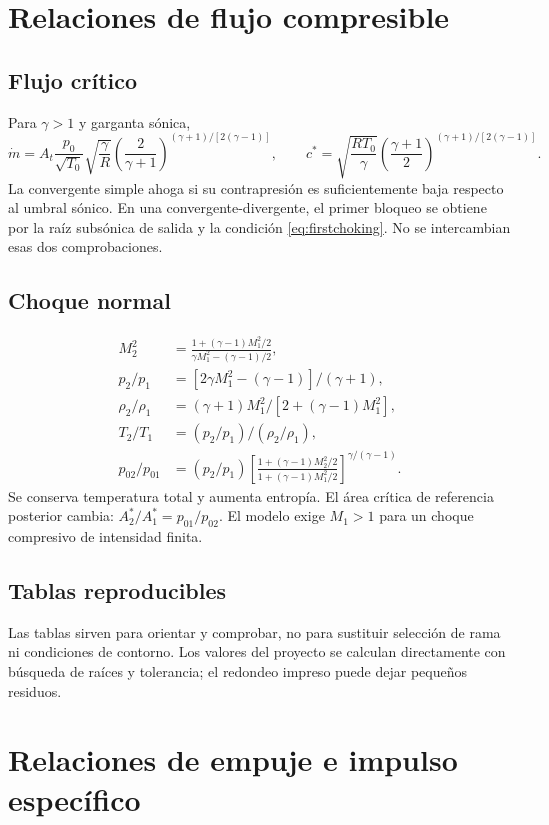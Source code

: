 \chapter{Relaciones de flujo compresible}\label{app:compressible}
\section{Flujo crítico}
Para $\gamma>1$ y garganta sónica,
\[
 \dot m=A_t\frac{p_0}{\sqrt{T_0}}\sqrt{\frac\gamma R}
 \left(\frac2{\gamma+1}\right)^{(\gamma+1)/[2(\gamma-1)]},
\qquad
 c^*=\sqrt{\frac{RT_0}\gamma}
 \left(\frac{\gamma+1}2\right)^{(\gamma+1)/[2(\gamma-1)]}.
\]
La convergente simple ahoga si su contrapresión es suficientemente baja respecto al umbral sónico. En una convergente-divergente, el primer bloqueo se obtiene por la raíz subsónica de salida y la condición \eqref{eq:firstchoking}. No se intercambian esas dos comprobaciones.
\section{Choque normal}
\begin{align*}
 M_2^2&=\frac{1+(\gamma-1)M_1^2/2}{\gamma M_1^2-(\gamma-1)/2},\\
 p_2/p_1&=[2\gamma M_1^2-(\gamma-1)]/(\gamma+1),\\
 \rho_2/\rho_1&=(\gamma+1)M_1^2/[2+(\gamma-1)M_1^2],\\
 T_2/T_1&=(p_2/p_1)/(\rho_2/\rho_1),\\
 p_{02}/p_{01}&=(p_2/p_1)\left[\frac{1+(\gamma-1)M_2^2/2}{1+(\gamma-1)M_1^2/2}\right]^{\gamma/(\gamma-1)}.
\end{align*}
Se conserva temperatura total y aumenta entropía. El área crítica de referencia posterior cambia: $A^*_2/A^*_1=p_{01}/p_{02}$. El modelo exige $M_1>1$ para un choque compresivo de intensidad finita.
\section{Tablas reproducibles}

Las tablas sirven para orientar y comprobar, no para sustituir selección de rama ni condiciones de contorno. Los valores del proyecto se calculan directamente con búsqueda de raíces y tolerancia; el redondeo impreso puede dejar pequeños residuos.
\chapter{Relaciones de empuje e impulso específico}\label{app:thrust}
